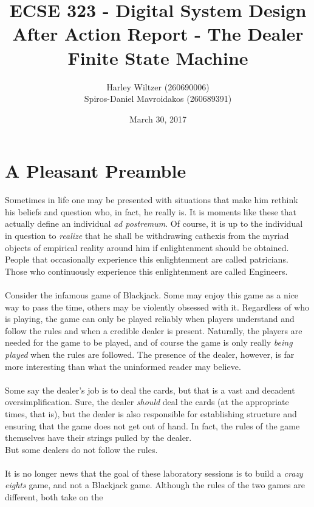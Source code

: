 \documentclass[12pt]{report}
\title{ECSE 323 - Digital System Design\\After Action Report - The Dealer Finite State Machine}
\author{Harley Wiltzer (260690006)\\Spiros-Daniel Mavroidakos (260689391)}
\date{March 30, 2017}
\begin{document}
\maketitle
\newpage
\pagestyle{fancy}
\fancyhf{}
\tableofcontents

\part{A Pleasant Preamble}
\label{s:preamble}
\lettrine{S}ometimes in life one may be presented with situations that make him rethink his beliefs and
question who, in fact, he really is. It is moments like these that actually define an individual
\textit{ad postremum}. Of course, it is up to the individual in question to \textit{realize} that he shall be
withdrawing cathexis from the myriad objects of empirical reality around him if enlightenment should
be obtained. People that occasionally experience this enlightenment are called patricians. Those who
continuously experience this enlightenment are called Engineers.\\\\
Consider the infamous game of Blackjack. Some may enjoy this game as a nice way to pass the time,
others may be violently obsessed with it. Regardless of who is playing, the game can only be played
reliably when players understand and follow the rules and when a credible dealer is present.
Naturally, the players are needed for the game to be played, and of course the game is only really
\textit{being played} when the rules are followed. The presence of the dealer, however, is far more
interesting than what the uninformed reader may believe.\\\\
Some say the dealer's job is to deal the cards, but that is a vast and decadent oversimplification.
Sure, the dealer \textit{should} deal the cards (at the appropriate times, that is), but the dealer
is also responsible for establishing structure and ensuring that the game does not get out of hand.
In fact, the rules of the game themselves have their strings pulled by the dealer. \\But some dealers
do not follow the rules.\\\\
It is no longer news that the goal of these laboratory sessions is to build a \textit{crazy eights}
game, and not a Blackjack game. Although the rules of the two games are different, both take on the
\end{document}
